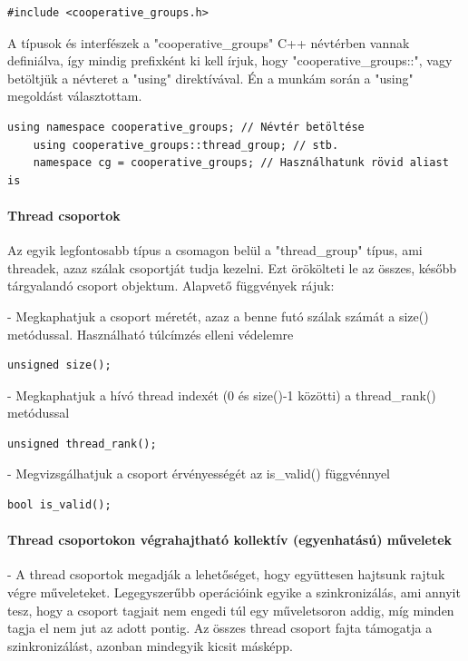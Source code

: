 \begin{lstlisting}[style=CStyle]
	#include <cooperative_groups.h>
\end{lstlisting}

A típusok és interfészek a "cooperative\_groups" C++ névtérben vannak definiálva, így mindig prefixként ki kell írjuk, hogy "cooperative\_groups::", vagy betöltjük a névteret a "using" direktívával. Én a munkám során a "using" megoldást választottam.

\begin{lstlisting}[style=CStyle]
	using namespace cooperative_groups; // Névtér betöltése
	using cooperative_groups::thread_group; // stb. 
	namespace cg = cooperative_groups; // Használhatunk rövid aliast is
\end{lstlisting}

\paragraph{Thread csoportok}
Az egyik legfontosabb típus a csomagon belül a "thread\_group" típus, ami threadek, azaz szálak csoportját tudja kezelni. Ezt örökölteti le az összes, később tárgyalandó csoport objektum. Alapvető függvények rájuk:

- Megkaphatjuk a csoport méretét, azaz a benne futó szálak számát a size() metódussal. Használható túlcímzés elleni védelemre
\begin{lstlisting}[style=CStyle]
	unsigned size();
\end{lstlisting}
- Megkaphatjuk a hívó thread indexét (0 és size()-1 közötti) a thread\_rank() metódussal
\begin{lstlisting}[style=CStyle]
	unsigned thread_rank();
\end{lstlisting}
- Megvizsgálhatjuk a csoport érvényességét az is\_valid() függvénnyel
\begin{lstlisting}[style=CStyle]
	bool is_valid();
\end{lstlisting}


\paragraph{Thread csoportokon végrahajtható kollektív (egyenhatású) műveletek} -
A thread csoportok megadják a lehetőséget, hogy együttesen hajtsunk rajtuk végre műveleteket. Legegyszerűbb operációink egyike a szinkronizálás, ami annyit tesz, hogy a csoport tagjait nem engedi túl egy műveletsoron addig, míg minden tagja el nem jut az adott pontig. Az összes thread csoport fajta támogatja a szinkronizálást, azonban mindegyik kicsit másképp.

